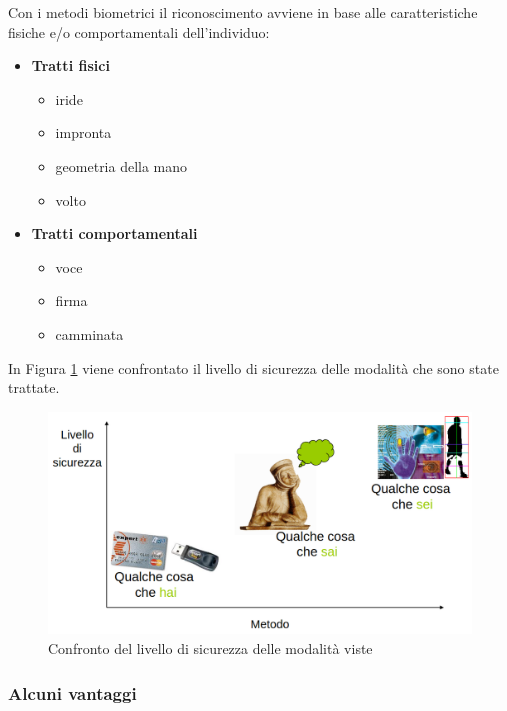 Con i metodi biometrici il riconoscimento avviene in base alle caratteristiche fisiche e/o comportamentali dell’individuo:
\begin{itemize}
    \item \textbf{Tratti fisici}

    \begin{itemize}
        \item iride
        \item impronta
        \item geometria della mano
        \item volto
    \end{itemize}
    \item \textbf{Tratti comportamentali}

    \begin{itemize}
        \item voce
        \item firma
        \item camminata
    \end{itemize}
\end{itemize}

\noindent In Figura \ref{fig:trad-vs-bio} viene confrontato il livello di sicurezza delle modalità che sono state trattate.

\begin{figure}
    \centering
    \includegraphics[width=0.75\linewidth]{chapters/images-chap1/tradizionali_vs_biometrici.png}
    \caption{Confronto del livello di sicurezza delle modalità viste}
    \label{fig:trad-vs-bio}
\end{figure}

\subsubsection{Alcuni vantaggi}


